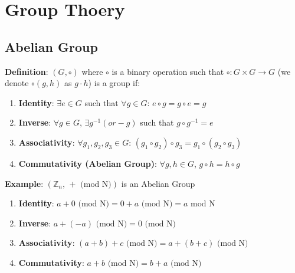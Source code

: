 \documentclass{scribe}
\begin{document}
\section{Group Thoery}

\subsection{Abelian Group}
\textbf{Definition}: $(G,\circ)$ where $\circ$ is a binary operation such that $\circ:G \times G \rightarrow G$ (we denote $\circ(g,h)$ as $g \cdot h$) is a group if:

\begin{enumerate}
    \item \textbf{Identity}: $\exists e \in G$ such that $\forall g \in G$: $e \circ g = g \circ e = g$
    \item \textbf{Inverse}: $\forall g \in G$, $\exists g^{-1} (or -g)$ such that $g \circ g^{-1} = e$
    \item \textbf{Associativity}: $\forall g_1, g_2, g_3 \in G$: $(g_1 \circ g_2) \circ g_3 = g_1 \circ (g_2 \circ g_3)$
    \item \textbf{Commutativity (Abelian Group)}: $\forall g,h \in G$, $g \circ h = h \circ g$
\end{enumerate}

\noindent\textbf{Example}: $(\mathbb{Z}_n \text{, } + \text{ (mod N)})$ is an Abelian Group
\begin{enumerate}
    \item \textbf{Identity}: $ a + 0 \text{ (mod N)} = 0 + a \text{ (mod N)} = a \text{ mod N}$
    \item \textbf{Inverse}: $a+ (-a) \text{ (mod N)} = 0 \text{ (mod N)}$
    \item \textbf{Associativity}: $(a+b)+c \text{ (mod N)} = a+(b+c) \text{ (mod N)} $
    \item \textbf{Commutativity}: $a+b \text{ (mod N)} = b+a \text{ (mod N)}$
\end{enumerate}
\end{document}
